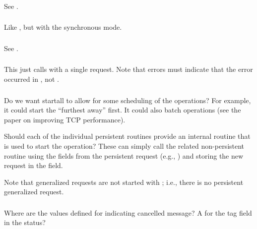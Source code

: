 \documentclass{article}
\begin{document}
\subsubsection{}
See .

\subsubsection{}
Like , but with the synchronous mode.

\subsubsection{}
See .

\subsubsection{}
This just calls  with a single request.  Note that
errors must indicate that the error occurred in , not
.  

\subsubsection{}
Do we want startall to allow for some scheduling of the operations?  For
example, it could start the ``furthest away'' first.  It could also batch
operations (see the paper on improving TCP performance).

Should each of the individual persistent routines provide an internal
routine that is used to start the operation?
These can simply call the related non-persistent routine using the fields from
the persistent request (e.g., )
and storing the new request in the 
field. 

Note that generalized requests are not started with ; i.e.,
there is no persistent generalized request.

\subsubsection{}
Where are the values defined for indicating cancelled message?
A  for the tag field in the status?
\end{document}
